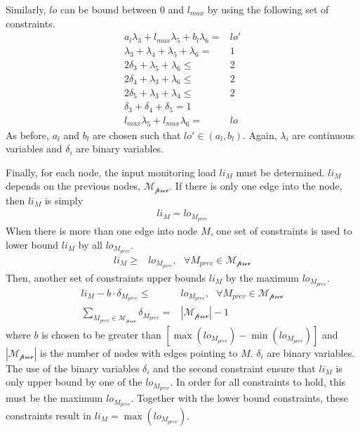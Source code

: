 Similarly, $lo$ can be bound between $0$ and $l_{max}$ by using the following
set of constraints.
\begin{align*}
  a_l\lambda_3 + l_{max}\lambda_5 + b_l\lambda_6 =& lo'\\
  \lambda_3 + \lambda_4 + \lambda_5 + \lambda_6 =& 1 \\
  2 \delta_3 + \lambda_5 + \lambda_6 \leq& 2 \\
  2 \delta_4 + \lambda_3 + \lambda_6 \leq& 2 \\
  2 \delta_5 + \lambda_3 + \lambda_4 \leq& 2 \\
  \delta_3 + \delta_4 + \delta_5 = 1 \\
  l_{max}\lambda_5 + l_{max}\lambda_6 =& lo
\end{align*}
As before, $a_l$ and $b_l$ are chosen such that $lo' \in (a_l, b_l)$.  Again,
$\lambda_i$ are continuous variables and $\delta_i$  are binary variables.

Finally, for each node, the input monitoring load $li_{M}$ must be determined.
$li_{M}$ depends on the previous nodes, $\mathcal{M_\text{prev}}$. If there is
only one edge into the node, then $li_M$ is simply
\begin{align*}
  li_{M} = lo_{M_{prev}}
\end{align*}
When there is more than one edge into node $M$, one set of constraints is used
to lower bound $li_{M}$ by all $lo_{M_{prev}}$.
\begin{align*}
  li_{M} \geq& lo_{M_{prev}}, \text{ } \forall M_{prev} \in \mathcal{M_\text{prev}}
\end{align*}
Then, another set of constraints upper bounds $li_{M}$ by the maximum $lo_{M_{prev}}$.
\begin{align*}
  li_{M} - b \cdot \delta_{M_{prev}} \leq& lo_{M_{prev}}, \text{ } \forall M_{prev} \in \mathcal{M_\text{prev}} \\
  \sum_{M_{prev} \in \mathcal{M_\text{prev}}}\delta_{M_{prev}} =& |\mathcal{M_\text{prev}}| - 1
\end{align*}
where $b$ is chosen to be greater than $\left[\max(lo_{M_{prev}}) -
\min(lo_{M_{prev}})\right]$ and $|\mathcal{M_\text{prev}}|$ is the number of nodes
with edges pointing to $M$. $\delta_i$ are binary variables. The use of the
binary variables $\delta_i$ and the second constraint ensure that $li_{M}$ is
only upper bound by one of the $lo_{M_{prev}}$. In order for all constraints to
hold, this must be the maximum $lo_{M_{prev}}$. Together with the lower bound
constraints, these constraints result in $li_{M} = \max(lo_{M_{prev}})$. 

